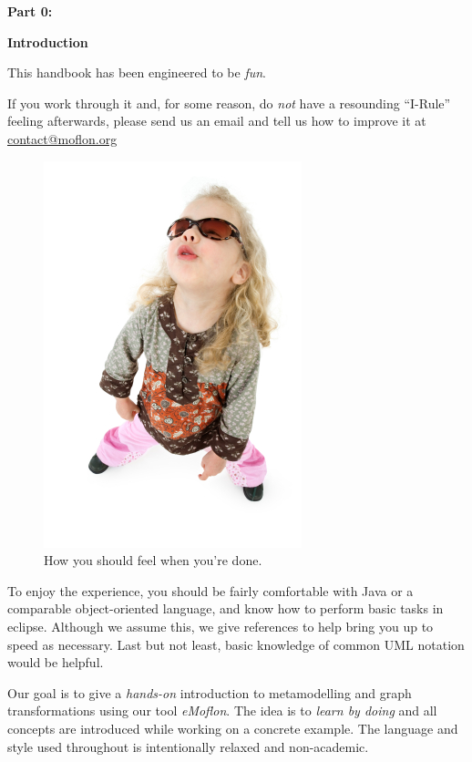 \genHeader

{\bf \huge Part 0:}

\vspace{0.8cm}

{\bf \Huge Introduction }

\vspace{2cm}


This handbook has been engineered to be \emph{fun}.

If you work through it and, for some reason, do \emph{not} have a resounding \mbox{``I-Rule''} feeling afterwards, please send us an email and tell us how to improve it at \href{mailto:contact@moflon.org}{contact@moflon.org}

\begin{figure}[htp]
\begin{center}
	\includegraphics[height=0.45\textheight]{../introduction_images/i-rule}
	\caption{How you should feel when you're done.}
	\label{i-rule}
\end{center}
\end{figure}
\break
 

To enjoy the experience, you should be fairly comfortable with Java or a comparable object-oriented language, and know how to perform basic tasks in eclipse.  Although we assume this, we give references to help bring you up to speed as necessary. Last but not least, basic knowledge of common UML notation would be helpful.

Our goal is to give a \emph{hands-on} introduction to metamodelling and graph transformations using our tool \emph{eMoflon}. The idea is to \emph{learn by doing} and all concepts are introduced while working on a concrete example. The language and style used throughout is intentionally relaxed and non-academic.


